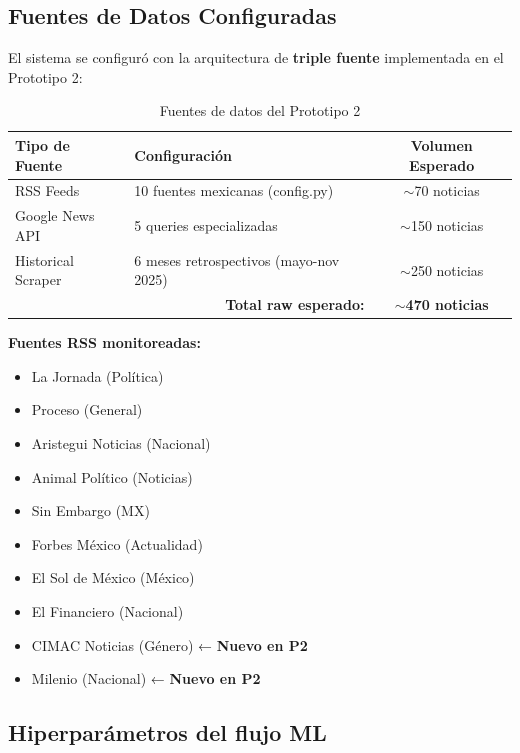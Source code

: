 \subsection{Fuentes de Datos Configuradas}
\label{subsec:fuentes_datos}

El sistema se configuró con la arquitectura de \textbf{triple fuente} implementada en el Prototipo 2:

\begin{table}[h]
\centering
\caption{Fuentes de datos del Prototipo 2}
\begin{tabular}{|l|l|c|}
\hline
\textbf{Tipo de Fuente} & \textbf{Configuración} & \textbf{Volumen Esperado} \\ \hline
RSS Feeds & 10 fuentes mexicanas (config.py) & $\sim$70 noticias \\ \hline
Google News API & 5 queries especializadas & $\sim$150 noticias \\ \hline
Historical Scraper & 6 meses retrospectivos (mayo-nov 2025) & $\sim$250 noticias \\ \hline
\multicolumn{2}{|r|}{\textbf{Total raw esperado:}} & \textbf{$\sim$470 noticias} \\ \hline
\end{tabular}
\end{table}

\textbf{Fuentes RSS monitoreadas:}
\begin{itemize}
    \item La Jornada (Política)
    \item Proceso (General)
    \item Aristegui Noticias (Nacional)
    \item Animal Político (Noticias)
    \item Sin Embargo (MX)
    \item Forbes México (Actualidad)
    \item El Sol de México (México)
    \item El Financiero (Nacional)
    \item CIMAC Noticias (Género) ← \textbf{Nuevo en P2}
    \item Milenio (Nacional) ← \textbf{Nuevo en P2}
\end{itemize}

\subsection{Hiperparámetros del flujo ML}
\label{subsec:hiperparametros}

